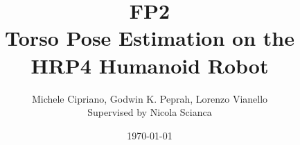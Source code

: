 \documentclass[a4paper]{article}
\begin{document}
\sloppy %


\title{FP2\\Torso Pose Estimation on the HRP4 Humanoid Robot}								%
\author{Michele Cipriano, Godwin K. Peprah, Lorenzo Vianello\\Supervised by Nicola Scianca}								%
\date{\today}											%

\makeatletter
\let\thetitle\@title
\let\theauthor\@author
\let\thedate\@date
\makeatother
\end{document}
